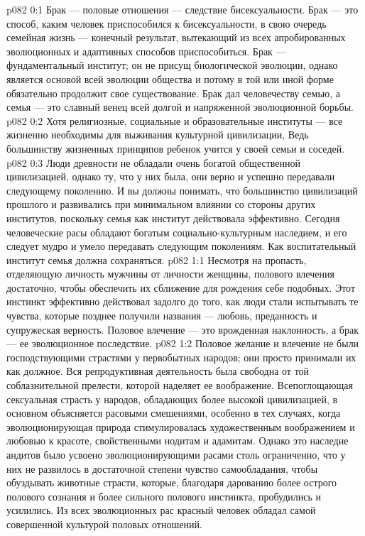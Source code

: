 \author{Глава Серафимов}
\vs p082 0:1 Брак --- половые отношения --- следствие бисексуальности. Брак --- это способ, каким человек приспособился к бисексуальности, в свою очередь семейная жизнь --- конечный результат, вытекающий из всех апробированных эволюционных и адаптивных способов приспособиться. Брак --- фундаментальный институт; он не присущ биологической эволюции, однако является основой всей эволюции общества и потому в той или иной форме обязательно продолжит свое существование. Брак дал человечеству семью, а семья --- это славный венец всей долгой и напряженной эволюционной борьбы.
\vs p082 0:2 Хотя религиозные, социальные и образовательные институты --- все жизненно необходимы для выживания культурной цивилизации,  Ведь большинству жизненных принципов ребенок учится у своей семьи и соседей.
\vs p082 0:3 Люди древности не обладали очень богатой общественной цивилизацией, однако ту, что у них была, они верно и успешно передавали следующему поколению. И вы должны понимать, что большинство цивилизаций прошлого и развивались при минимальном влиянии со стороны других институтов, поскольку семья как институт действовала эффективно. Сегодня человеческие расы обладают богатым социально\hyp{}культурным наследием, и его следует мудро и умело передавать следующим поколениям. Как воспитательный институт семья должна сохраняться.
\vs p082 1:1 Несмотря на пропасть, отделяющую личность мужчины от личности женщины, полового влечения достаточно, чтобы обеспечить их сближение для рождения себе подобных. Этот инстинкт эффективно действовал задолго до того, как люди стали испытывать те чувства, которые позднее получили названия --- любовь, преданность и супружеская верность. Половое влечение --- это врожденная наклонность, а брак --- ее эволюционное последствие.
\vs p082 1:2 Половое желание и влечение не были господствующими страстями у первобытных народов; они просто принимали их как должное. Вся репродуктивная деятельность была свободна от той соблазнительной прелести, которой наделяет ее воображение. Всепоглощающая сексуальная страсть у народов, обладающих более высокой цивилизацией, в основном объясняется расовыми смешениями, особенно в тех случаях, когда эволюционирующая природа стимулировалась художественным воображением и любовью к красоте, свойственными нодитам и адамитам. Однако это наследие андитов было усвоено эволюционирующими расами столь ограниченно, что у них не развилось в достаточной степени чувство самообладания, чтобы обуздывать животные страсти, которые, благодаря дарованию более острого полового сознания и более сильного полового инстинкта, пробудились и усилились. Из всех эволюционных рас красный человек обладал самой совершенной культурой половых отношений.
